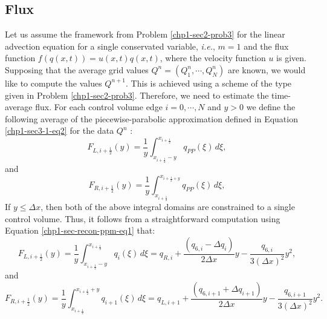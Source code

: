 \subsection{Flux}
\label{chp1-sec-flux}

Let us assume the framework from Problem \ref{chp1-sec2-prob3} for the linear advection
equation for a single conservated variable, \textit{i.e.}, 
$m=1$ and the flux function $f(q(x,t)) = u(x,t)q(x,t)$,
where the velocity function $u$ is given.
Supposing that the average grid values $Q^{n} = (Q^{n}_1, \cdots, Q^{n}_N)$ are known,
we would like to compute the values $Q^{n+1}$.
This is achieved using a scheme of the type given in Problem \ref{chp1-sec2-prob3}.
Therefore, we need to estimate the time-average flux.
For each control volume edge $i=0, \cdots, N$ and $y>0$ 
we define the following average of the piecewise-parabolic approximation
defined in Equation \eqref{chp1-sec3-1-eq2} for the data $Q^{n}$ \citep{colella:1984}:
\begin{equation}
	\label{chp-sec-flux:fL_1}
	F_{L,i+\frac{1}{2}}(y) = \frac{1}{y} \int_{x_{i+\frac{1}{2}}-y}^{x_{i+\frac{1}{2}}}
	q_{PP}(\xi)\,d\xi,
\end{equation}
and
\begin{equation}
	\label{chp-sec-flux:fR_1}
	F_{R,i+\frac{1}{2}}(y) = \frac{1}{y} \int_{x_{i+\frac{1}{2}}}^{x_{i+\frac{1}{2}+y}}
	q_{PP}(\xi)\,d\xi,
\end{equation}
If $y \leq \Delta x$, then both of the above integral domains
are constrained to  a single control volume. Thus,
it follows from a straightforward computation using 
Equation \eqref{chp1-sec-recon-ppm-eq1} that:
\begin{equation}
	\label{chp-sec-flux:fL_2}
	F_{L,i+\frac{1}{2}}(y) = \frac{1}{y} \int_{x_{i+\frac{1}{2}}-y}^{x_{i+\frac{1}{2}}}
	q_{i}(\xi)\,d\xi = 
	q_{R,i} +\frac{(q_{6,i} - \Delta q_i)}{2\Delta x}y
	- \frac{q_{6,i}}{3(\Delta x)^2}y^2,
\end{equation}
and
\begin{equation}
	\label{chp-sec-flux:fR_2}
	F_{R,i+\frac{1}{2}}(y) = \frac{1}{y} \int_{x_{i+\frac{1}{2}}}^{x_{i+\frac{1}{2}}+y}
	q_{i+1}(\xi)\,d\xi = 
	q_{L,i+1} +\frac{(q_{6,i+1} + \Delta q_{i+1})}{2\Delta x}y
	- \frac{q_{6,i+1}}{3(\Delta x)^2}y^2.
\end{equation}

